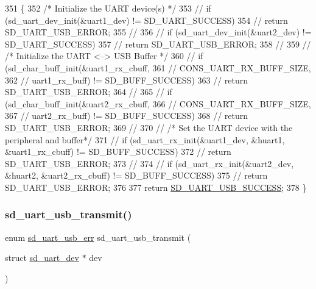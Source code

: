 \begin{DoxyCode}
351 \{
352     \textcolor{comment}{/* Initialize the UART device(s) */}
353 \textcolor{comment}{//  if (sd\_uart\_dev\_init(&uart1\_dev) != SD\_UART\_SUCCESS)}
354 \textcolor{comment}{//      return SD\_UART\_USB\_ERROR;}
355 \textcolor{comment}{//  }
356 \textcolor{comment}{//  if (sd\_uart\_dev\_init(&uart2\_dev) != SD\_UART\_SUCCESS)}
357 \textcolor{comment}{//      return SD\_UART\_USB\_ERROR;}
358 \textcolor{comment}{//  }
359 \textcolor{comment}{//  /* Initialize the UART <--> USB Buffer */}
360 \textcolor{comment}{//  if (sd\_char\_buff\_init(&uart1\_rx\_cbuff, }
361 \textcolor{comment}{//                CONS\_UART\_RX\_BUFF\_SIZE, }
362 \textcolor{comment}{//                uart1\_rx\_buff) != SD\_BUFF\_SUCCESS)}
363 \textcolor{comment}{//      return SD\_UART\_USB\_ERROR;}
364 \textcolor{comment}{//  }
365 \textcolor{comment}{//  if (sd\_char\_buff\_init(&uart2\_rx\_cbuff, }
366 \textcolor{comment}{//                CONS\_UART\_RX\_BUFF\_SIZE,}
367 \textcolor{comment}{//                uart2\_rx\_buff) != SD\_BUFF\_SUCCESS)}
368 \textcolor{comment}{//      return SD\_UART\_USB\_ERROR;}
369 \textcolor{comment}{//  }
370 \textcolor{comment}{//  /* Set the UART device with the peripheral and buffer*/}
371 \textcolor{comment}{//  if (sd\_uart\_rx\_init(&uart1\_dev, &huart1, &uart1\_rx\_cbuff) != SD\_BUFF\_SUCCESS)}
372 \textcolor{comment}{//      return SD\_UART\_USB\_ERROR;}
373 \textcolor{comment}{//  }
374 \textcolor{comment}{//  if (sd\_uart\_rx\_init(&uart2\_dev, &huart2, &uart2\_rx\_cbuff) != SD\_BUFF\_SUCCESS)}
375 \textcolor{comment}{//      return SD\_UART\_USB\_ERROR;}
376 
377     \textcolor{keywordflow}{return} \mbox{\hyperlink{group___s_d___u_a_r_t___u_s_b___bridge___types_gga7e4773a8cce69fafe541cad55985f146a5f1ee74f25f6a6f1aa6b771dc91abe11}{SD\_UART\_USB\_SUCCESS}};
378 \}
\end{DoxyCode}
\mbox{\label{group___s_d___platform___function___declarations_ga7277fee3051720471dd68980c4928cbc}} 
\subsubsection{\texorpdfstring{sd\+\_\+uart\+\_\+usb\+\_\+transmit()}{sd\_uart\_usb\_transmit()}}
{\footnotesize\ttfamily enum \mbox{\hyperlink{group___s_d___u_a_r_t___u_s_b___bridge___types_ga7e4773a8cce69fafe541cad55985f146}{sd\+\_\+uart\+\_\+usb\+\_\+err}} sd\+\_\+uart\+\_\+usb\+\_\+transmit (\begin{DoxyParamCaption}\item[{struct \mbox{\hyperlink{structsd__uart__dev}{sd\+\_\+uart\+\_\+dev}} $\ast$}]{dev }\end{DoxyParamCaption})\hspace{0.3cm}{\ttfamily [inline]}}



